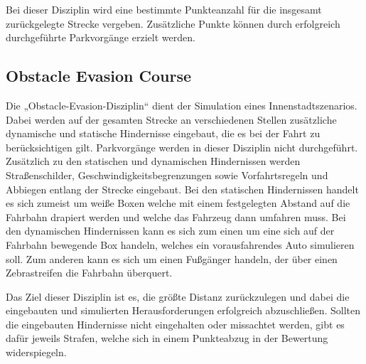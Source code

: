 Bei dieser Disziplin wird eine bestimmte Punkteanzahl für die insgesamt zurückgelegte Strecke vergeben. Zusätzliche
Punkte können durch erfolgreich durchgeführte Parkvorgänge erzielt werden.  

\subsection{Obstacle Evasion Course}
Die „Obstacle-Evasion-Disziplin“ dient der Simulation eines Innenstadtszenarios. Dabei werden auf der gesamten
Strecke an verschiedenen Stellen zusätzliche dynamische und statische Hindernisse eingebaut, die es bei der
Fahrt zu berücksichtigen gilt. Parkvorgänge werden in dieser Disziplin nicht durchgeführt. Zusätzlich zu den
statischen und dynamischen Hindernissen werden Straßenschilder, Geschwindigkeitsbegrenzungen sowie Vorfahrtsregeln
und Abbiegen entlang der Strecke eingebaut. Bei den statischen Hindernissen handelt es sich zumeist um weiße
Boxen welche mit einem festgelegten Abstand auf die Fahrbahn drapiert werden und welche das Fahrzeug dann umfahren
muss. Bei den dynamischen Hindernissen kann es sich zum einen um eine sich auf der Fahrbahn bewegende Box handeln,
welches ein vorausfahrendes Auto simulieren soll. Zum anderen kann es sich um einen Fußgänger handeln, der über
einen Zebrastreifen die Fahrbahn überquert.

Das Ziel dieser Disziplin ist es, die größte Distanz zurückzulegen und dabei die eingebauten und simulierten
Herausforderungen erfolgreich abzuschließen. Sollten die eingebauten Hindernisse nicht eingehalten oder missachtet
werden, gibt es dafür jeweils Strafen, welche sich in einem Punkteabzug in der Bewertung widerspiegeln.
